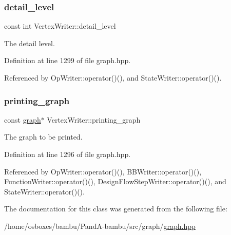 \subsubsection{\texorpdfstring{detail\+\_\+level}{detail\_level}}
{\footnotesize\ttfamily const int Vertex\+Writer\+::detail\+\_\+level\hspace{0.3cm}{\ttfamily [protected]}}



The detail level. 



Definition at line 1299 of file graph.\+hpp.



Referenced by Op\+Writer\+::operator()(), and State\+Writer\+::operator()().

\mbox{\label{classVertexWriter_a6251a08decfd5799557f8069cfde5d2e}} 
\subsubsection{\texorpdfstring{printing\+\_\+graph}{printing\_graph}}
{\footnotesize\ttfamily const \hyperlink{structgraph}{graph}$\ast$ Vertex\+Writer\+::printing\+\_\+graph\hspace{0.3cm}{\ttfamily [protected]}}



The graph to be printed. 



Definition at line 1296 of file graph.\+hpp.



Referenced by Op\+Writer\+::operator()(), B\+B\+Writer\+::operator()(), Function\+Writer\+::operator()(), Design\+Flow\+Step\+Writer\+::operator()(), and State\+Writer\+::operator()().



The documentation for this class was generated from the following file\+:\begin{DoxyCompactItemize}
\item 
/home/osboxes/bambu/\+Pand\+A-\/bambu/src/graph/\hyperlink{graph_8hpp}{graph.\+hpp}\end{DoxyCompactItemize}
